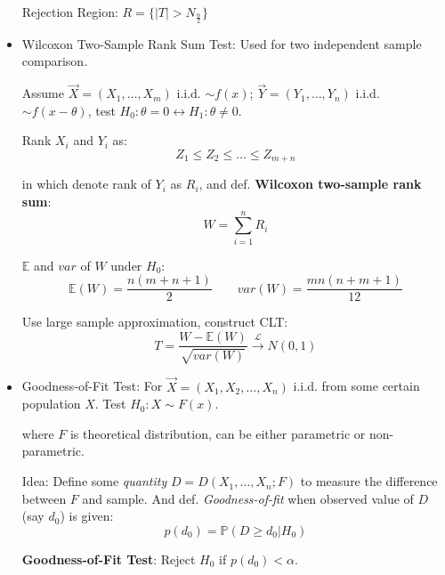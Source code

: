 \begin{itemize}
        Rejection Region: $R=\{|T|>N_\frac{\alpha}{2}\}$

        \item Wilcoxon Two-Sample Rank Sum Test: Used for two independent sample comparison.
        
        Assume $\vec{X}=(X_1,\ldots,X_m)$ i.i.d. $\sim f(x)$; $\vec{Y}=(Y_1,\ldots,Y_n)$ i.i.d. $\sim f(x-\theta)$, test $H_0:\theta=0\longleftrightarrow H_1:\theta\neq 0$.

        Rank $X_i$ and $Y_i$ as:
        \begin{equation}
            Z_1\leq Z_2\leq\ldots\leq Z_{m+n}
        \end{equation}

        in which denote rank of $Y_i$ as $R_i$, and def. \textbf{Wilcoxon two-sample rank sum}:
        \begin{equation}W=\sum_{i=1}^n R_i\end{equation}

        $\mathbb{E}$ and $var$ of $W$ under $H_0$:
\begin{equation}\mathbb{E}(W)=\frac{n(m+n+1)}{2}\qquad var(W)=\frac{mn(n+m+1)}{12}\end{equation}

        Use large sample approximation, construct CLT:
        \begin{equation}
            T=\frac{W-\mathbb{E}(W)}{\sqrt{var(W)}}\xrightarrow[]{\mathscr{L}}N(0,1)
        \end{equation}







        \item Goodness-of-Fit Test: For $\vec{X}=(X_1,X_2,\ldots,X_n)$ i.i.d. from some certain population $X$. Test $H_0:X\sim F(x)$.
        
        where $F$ is theoretical distribution, can be either parametric or non-parametric.

        Idea: Define some \textit{quantity} $D=D(X_1,\ldots,X_n;F)$ to measure the difference between $F$ and sample. And def. \textit{Goodness-of-fit} when observed value of $D$ (say $d_0$) is given:
        \begin{equation}p(d_0)=\mathbb{P}(D\geq d_0|H_0)\end{equation}

        \textbf{Goodness-of-Fit Test}: Reject $H_0$ if $p(d_0)<\alpha$.



\end{itemize}
